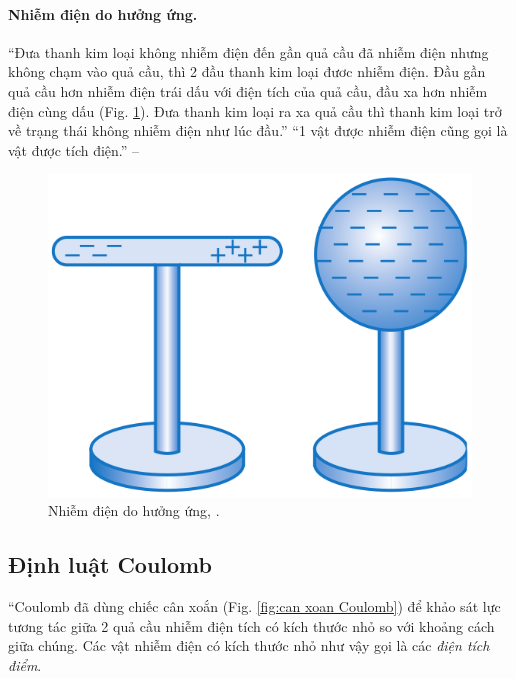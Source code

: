 \documentclass[oneside]{book}
\numberwithin{equation}{section}
\begin{document}
\paragraph{Nhiễm điện do hưởng ứng.} ``Đưa thanh kim loại không nhiễm điện đến gần quả cầu đã nhiễm điện nhưng không chạm vào quả cầu, thì 2 đầu thanh kim loại đươc nhiễm điện. Đầu gần quả cầu hơn nhiễm điện trái dấu với điện tích của quả cầu, đầu xa hơn nhiễm điện cùng dấu (Fig. \ref{fig:nhiem dien do huong ung}). Đưa thanh kim loại ra xa quả cầu thì thanh kim loại trở về trạng thái không nhiễm điện như lúc đầu.'' ``1 vật được nhiễm điện cũng gọi là vật được tích điện.'' -- \cite[p. 7]{SGK_Vat_Ly_11_nang_cao}

\begin{figure}[H]
	\centering
	\includegraphics[scale=0.15]{nhiem_dien_do_huong_ung}
	\caption{Nhiễm điện do hưởng ứng, \cite[Hình 1.4, p. 7]{SGK_Vat_Ly_11_nang_cao}.}
	\label{fig:nhiem dien do huong ung}
\end{figure}

\subsection{Định luật Coulomb}
``Coulomb đã dùng chiếc cân xoắn (Fig. \ref{fig:can xoan Coulomb}) để khảo sát lực tương tác giữa 2 quả cầu nhiễm điện tích có kích thước nhỏ so với khoảng cách giữa chúng. Các vật nhiễm điện có kích thước nhỏ như vậy gọi là các \textit{điện tích điểm}.
\end{document}
